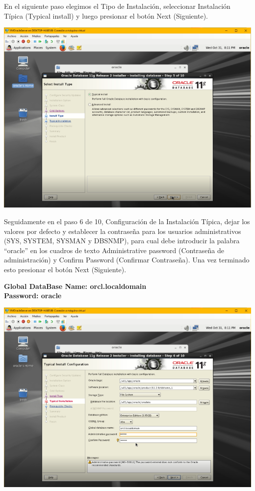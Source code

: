 \vspace{\baselineskip}

En el siguiente paso elegimos el Tipo de Instalación, seleccionar Instalación Típica (Typical install) y luego presionar el botón Next (Siguiente).
\begin{center}
	\includegraphics[width=14cm]{./Imagenes/75} 
\end{center}

\vspace{\baselineskip}

Seguidamente en el paso 6 de 10, Configuración de la Instalación Típica, dejar los valores por defecto y establecer la contraseña para los usuarios administrativos (SYS, SYSTEM, SYSMAN y DBSNMP), para cual debe introducir la palabra “oracle” en los cuadros de texto Administrative password (Contraseña de administración) y Confirm Password (Confirmar Contraseña). Una vez terminado esto presionar el botón Next (Siguiente).
	\begin{center}
		\textbf{\large Global DataBase Name: orcl.localdomain \\ Password: oracle
		}		
	\end{center}
\begin{center}
	\includegraphics[width=14cm]{./Imagenes/76} 
\end{center}

